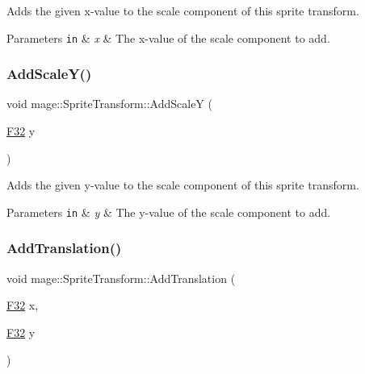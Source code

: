 Adds the given x-\/value to the scale component of this sprite transform.


\begin{DoxyParams}[1]{Parameters}
\mbox{\tt in}  & {\em x} & The x-\/value of the scale component to add. \\
\hline
\end{DoxyParams}
\hypertarget{structmage_1_1_sprite_transform_ad2254dc1ae1fc1d9332bd00fed8eb4af}{}\label{structmage_1_1_sprite_transform_ad2254dc1ae1fc1d9332bd00fed8eb4af} 
\subsubsection{\texorpdfstring{Add\+Scale\+Y()}{AddScaleY()}}
{\footnotesize\ttfamily void mage\+::\+Sprite\+Transform\+::\+Add\+ScaleY (\begin{DoxyParamCaption}\item[{\hyperlink{namespacemage_aa97e833b45f06d60a0a9c4fc22ae02c0}{F32}}]{y }\end{DoxyParamCaption})\hspace{0.3cm}{\ttfamily [noexcept]}}

Adds the given y-\/value to the scale component of this sprite transform.


\begin{DoxyParams}[1]{Parameters}
\mbox{\tt in}  & {\em y} & The y-\/value of the scale component to add. \\
\hline
\end{DoxyParams}
\hypertarget{structmage_1_1_sprite_transform_a567a3bd6476151f65d8ca62f818bba45}{}\label{structmage_1_1_sprite_transform_a567a3bd6476151f65d8ca62f818bba45} 
\subsubsection{\texorpdfstring{Add\+Translation()}{AddTranslation()}\hspace{0.1cm}{\footnotesize\ttfamily [1/3]}}
{\footnotesize\ttfamily void mage\+::\+Sprite\+Transform\+::\+Add\+Translation (\begin{DoxyParamCaption}\item[{\hyperlink{namespacemage_aa97e833b45f06d60a0a9c4fc22ae02c0}{F32}}]{x,  }\item[{\hyperlink{namespacemage_aa97e833b45f06d60a0a9c4fc22ae02c0}{F32}}]{y }\end{DoxyParamCaption})\hspace{0.3cm}{\ttfamily [noexcept]}}

